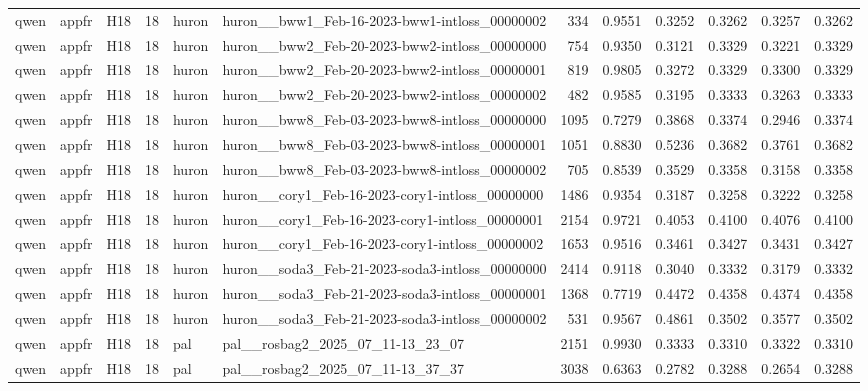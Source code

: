 \begin{table}[tbp]
\begin{tabular}{lllrllrrrrrr}
qwen & appfr & H18 & 18 & huron & huron\_\_bww1\_Feb-16-2023-bww1-intloss\_00000002 & 334 & 0.9551 & 0.3252 & 0.3262 & 0.3257 & 0.3262 \\
qwen & appfr & H18 & 18 & huron & huron\_\_bww2\_Feb-20-2023-bww2-intloss\_00000000 & 754 & 0.9350 & 0.3121 & 0.3329 & 0.3221 & 0.3329 \\
qwen & appfr & H18 & 18 & huron & huron\_\_bww2\_Feb-20-2023-bww2-intloss\_00000001 & 819 & 0.9805 & 0.3272 & 0.3329 & 0.3300 & 0.3329 \\
qwen & appfr & H18 & 18 & huron & huron\_\_bww2\_Feb-20-2023-bww2-intloss\_00000002 & 482 & 0.9585 & 0.3195 & 0.3333 & 0.3263 & 0.3333 \\
qwen & appfr & H18 & 18 & huron & huron\_\_bww8\_Feb-03-2023-bww8-intloss\_00000000 & 1095 & 0.7279 & 0.3868 & 0.3374 & 0.2946 & 0.3374 \\
qwen & appfr & H18 & 18 & huron & huron\_\_bww8\_Feb-03-2023-bww8-intloss\_00000001 & 1051 & 0.8830 & 0.5236 & 0.3682 & 0.3761 & 0.3682 \\
qwen & appfr & H18 & 18 & huron & huron\_\_bww8\_Feb-03-2023-bww8-intloss\_00000002 & 705 & 0.8539 & 0.3529 & 0.3358 & 0.3158 & 0.3358 \\
qwen & appfr & H18 & 18 & huron & huron\_\_cory1\_Feb-16-2023-cory1-intloss\_00000000 & 1486 & 0.9354 & 0.3187 & 0.3258 & 0.3222 & 0.3258 \\
qwen & appfr & H18 & 18 & huron & huron\_\_cory1\_Feb-16-2023-cory1-intloss\_00000001 & 2154 & 0.9721 & 0.4053 & 0.4100 & 0.4076 & 0.4100 \\
qwen & appfr & H18 & 18 & huron & huron\_\_cory1\_Feb-16-2023-cory1-intloss\_00000002 & 1653 & 0.9516 & 0.3461 & 0.3427 & 0.3431 & 0.3427 \\
qwen & appfr & H18 & 18 & huron & huron\_\_soda3\_Feb-21-2023-soda3-intloss\_00000000 & 2414 & 0.9118 & 0.3040 & 0.3332 & 0.3179 & 0.3332 \\
qwen & appfr & H18 & 18 & huron & huron\_\_soda3\_Feb-21-2023-soda3-intloss\_00000001 & 1368 & 0.7719 & 0.4472 & 0.4358 & 0.4374 & 0.4358 \\
qwen & appfr & H18 & 18 & huron & huron\_\_soda3\_Feb-21-2023-soda3-intloss\_00000002 & 531 & 0.9567 & 0.4861 & 0.3502 & 0.3577 & 0.3502 \\
qwen & appfr & H18 & 18 & pal & pal\_\_rosbag2\_2025\_07\_11-13\_23\_07 & 2151 & 0.9930 & 0.3333 & 0.3310 & 0.3322 & 0.3310 \\
qwen & appfr & H18 & 18 & pal & pal\_\_rosbag2\_2025\_07\_11-13\_37\_37 & 3038 & 0.6363 & 0.2782 & 0.3288 & 0.2654 & 0.3288 \\

\end{tabular}
\end{table}
